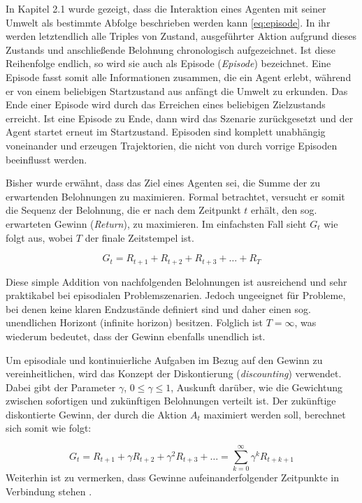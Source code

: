 In Kapitel 2.1 wurde gezeigt, dass die Interaktion eines Agenten mit seiner Umwelt als bestimmte Abfolge beschrieben werden kann \eqref{eq:episode}. In ihr werden letztendlich alle Triples von Zustand, ausgeführter Aktion aufgrund dieses Zustands und anschließende Belohnung chronologisch aufgezeichnet. Ist diese Reihenfolge endlich, so wird sie auch als Episode (\textit{Episode}) bezeichnet. Eine Episode fasst somit alle Informationen zusammen, die ein Agent erlebt, während er von einem beliebigen Startzustand aus anfängt die Umwelt zu erkunden. Das Ende einer Episode wird durch das Erreichen eines beliebigen Zielzustands erreicht. Ist eine Episode zu Ende, dann wird das Szenarie zurückgesetzt und der Agent startet erneut im Startzustand. Episoden sind komplett unabhängig voneinander und erzeugen Trajektorien, die nicht von durch vorrige Episoden beeinflusst werden.
\par
Bisher wurde erwähnt, dass das Ziel eines Agenten sei, die Summe der zu erwartenden Belohnungen zu maximieren. Formal betrachtet, versucht er somit die Sequenz der Belohnung, die er nach dem Zeitpunkt $t$ erhält, den sog. erwarteten Gewinn (\textit{Return}), zu maximieren. Im einfachsten Fall sieht $G_t$ wie folgt aus, wobei $T$ der finale Zeitstempel ist.

\begin{equation}\label{eq:simpleReturn}
    G_t = R_{t+1} + R_{t+2} + R_{t+3} + \dots + R_{T}
\end{equation}

Diese simple Addition von nachfolgenden Belohnungen ist ausreichend und sehr praktikabel bei episodialen Problemszenarien. Jedoch ungeeignet für Probleme, bei denen keine klaren Endzustände definiert sind und daher einen sog. unendlichen Horizont (infinite horizon) besitzen. Folglich ist  $T=\infty$, was wiederum bedeutet, dass der Gewinn ebenfalls unendlich ist. 
\par 
Um episodiale und kontinuierliche Aufgaben im Bezug auf den Gewinn zu vereinheitlichen, wird das Konzept der Diskontierung (\textit{discounting}) verwendet. Dabei gibt der Parameter $\gamma$, $0\leq \gamma \leq 1$, Auskunft darüber, wie die Gewichtung zwischen sofortigen und zukünftigen Belohnungen verteilt ist. Der zukünftige diskontierte Gewinn, der durch die Aktion $A_t$ maximiert werden soll, berechnet sich somit wie folgt:

\begin{equation}\label{eq:discountedReturn}
    G_t = R_{t+1} + \gamma R_{t+2} + \gamma^2 R_{t+3} + \dots  = \sum_{k=0}^\infty{\gamma^k R_{t+k+1}}
\end{equation}
Weiterhin ist zu vermerken, dass Gewinne aufeinanderfolgender Zeitpunkte in Verbindung stehen \cite[S.55]{Sutton1998}.

